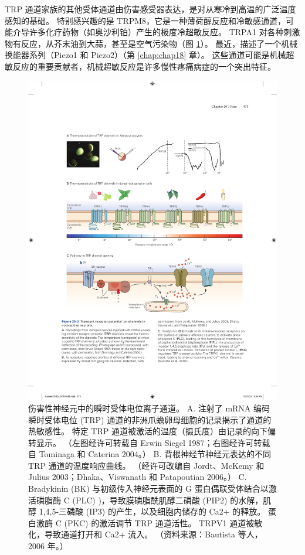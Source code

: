 TRP 通道家族的其他受体通道由伤害感受器表达，是对从寒冷到高温的广泛温度感知的基础。 
特别感兴趣的是 TRPM8，它是一种薄荷醇反应和冷敏感通道，可能介导许多化疗药物（如奥沙利铂）产生的极度冷超敏反应。 
TRPA1 对各种刺激物有反应，从芥末油到大蒜，甚至是空气污染物（图 \ref{fig:20_2}）。 最近，描述了一个机械换能器系列（Piezo1 和 Piezo2）（第 \ref{chap:chap18} 章）。 
这些通道可能是机械超敏反应的重要贡献者，机械超敏反应是许多慢性疼痛病症的一个突出特征。


\begin{figure}[htbp]
	\centering
	\includegraphics[width=0.7\linewidth]{chap20/fig_20_2}
	\caption{伤害性神经元中的瞬时受体电位离子通道。 
		A. 注射了 mRNA 编码瞬时受体电位 (TRP) 通道的非洲爪蟾卵母细胞的记录揭示了通道的热敏感性。 
		特定 TRP 通道被激活的温度（摄氏度）由记录的向下偏转显示。 （左图经许可转载自 Erwin Siegel 1987；右图经许可转载自 Tominaga 和 Caterina 2004。）
		B. 背根神经节神经元表达的不同 TRP 通道的温度响应曲线。 （经许可改编自 Jordt、McKemy 和 Julius 2003；Dhaka、Viswanath 和 Patapoutian 2006。）
		C. Bradykinin (BK) 与初级传入神经元表面的 G 蛋白偶联受体结合以激活磷脂酶 C (PLC) )，导致膜磷脂酰肌醇二磷酸 (PIP2) 的水解，肌醇 1,4,5-三磷酸 (IP3) 的产生，以及细胞内储存的 Ca2+ 的释放。 
		蛋白激酶 C (PKC) 的激活调节 TRP 通道活性。 
		TRPV1 通道被敏化，导致通道打开和 Ca2+ 流入。 （资料来源：Bautista 等人，2006 年。）}
	\label{fig:20_2}
\end{figure}

